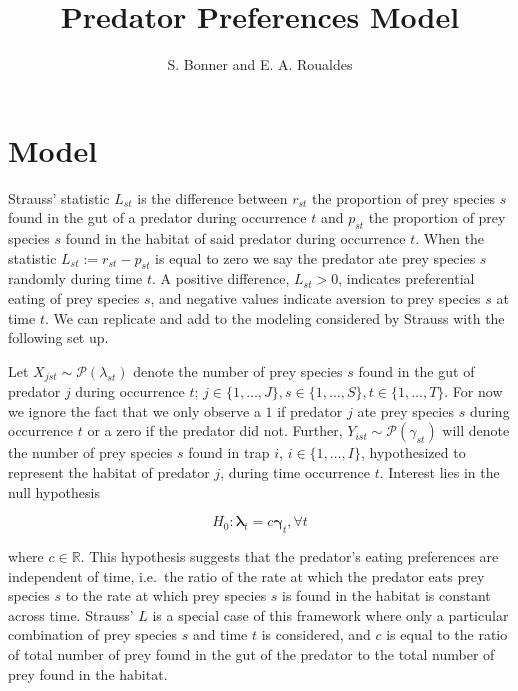 \documentclass[12pt]{article}\usepackage[]{graphicx}\usepackage[]{color}
\begin{document}
\title{Predator Preferences Model}
\author{S. Bonner and E. A. Roualdes}
\maketitle 



\section*{Model}
Strauss' statistic $L_{st}$ \cite{Strauss:1979} is the difference between $r_{st}$ the proportion of prey species $s$ found in the gut of a predator during occurrence $t$ and $p_{st}$ the proportion of prey species $s$ found in the habitat of said predator during occurrence $t$.  When the statistic $L_{st} := r_{st} - p_{st}$ is equal to zero we say the predator ate prey species $s$ randomly during time $t$.  A positive difference, $L_{st} > 0$, indicates preferential eating of prey species $s$, and negative values indicate aversion to prey species $s$ at time $t$.  We can replicate and add to the modeling considered by Strauss with the following set up.

Let $X_{jst} \sim \mathcal{P}(\lambda_{st})$ denote the number of prey species $s$ found in the gut of predator $j$ during occurrence $t$; $j \in \{1, \ldots, J\}, s \in \{1, \ldots, S\}, t \in \{1, \ldots, T\}$.  For now we ignore the fact that we only observe a $1$ if predator $j$ ate prey species $s$ during occurrence $t$ or a zero if the predator did not.  Further, $Y_{ist} \sim \mathcal{P}(\gamma_{st})$ will denote the number of prey species $s$ found in trap $i$, $i \in \{1, \ldots, I \}$, hypothesized to represent the habitat of predator $j$, during time occurrence $t$.  Interest lies in the null hypothesis

\begin{equation}
  \label{eq:null}
  H_0: \boldsymbol{\lambda}_t = c \boldsymbol{\gamma}_t, \forall t
\end{equation}

where $c \in \mathbb{R}$.  This hypothesis suggests that the predator's eating preferences are independent of time, i.e.\ the ratio of the rate at which the predator eats prey species $s$ to the rate at which prey species $s$ is found in the habitat is constant across time.  Strauss' $L$ is a special case of this framework where only a particular combination of prey species $s$ and time $t$ is considered, and $c$ is equal to the ratio of total number of prey found in the gut of the predator to the total number of prey found in the habitat.  
\end{document}

